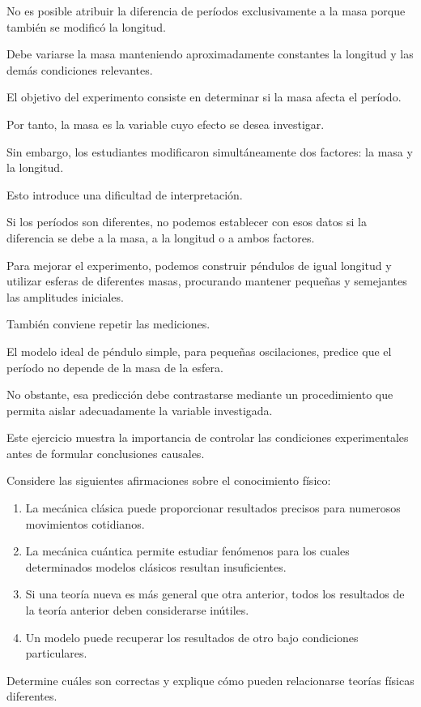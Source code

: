 \begin{respuesta}
No es posible atribuir la diferencia de períodos exclusivamente a la masa porque también se modificó la longitud.

Debe variarse la masa manteniendo aproximadamente constantes la longitud y las demás condiciones relevantes.
\end{respuesta}

\begin{explicacion}
El objetivo del experimento consiste en determinar si la masa afecta el período.

Por tanto, la masa es la variable cuyo efecto se desea investigar.

Sin embargo, los estudiantes modificaron simultáneamente dos factores: la masa y la longitud.

Esto introduce una dificultad de interpretación.

Si los períodos son diferentes, no podemos establecer con esos datos si la diferencia se debe a la masa, a la longitud o a ambos factores.

Para mejorar el experimento, podemos construir péndulos de igual longitud y utilizar esferas de diferentes masas, procurando mantener pequeñas y semejantes las amplitudes iniciales.

También conviene repetir las mediciones.

El modelo ideal de péndulo simple, para pequeñas oscilaciones, predice que el período no depende de la masa de la esfera.

No obstante, esa predicción debe contrastarse mediante un procedimiento que permita aislar adecuadamente la variable investigada.

Este ejercicio muestra la importancia de controlar las condiciones experimentales antes de formular conclusiones causales.
\end{explicacion}


\begin{ejercicio}
Considere las siguientes afirmaciones sobre el conocimiento físico:

\begin{enumerate}[label=\alph*)]
    \item La mecánica clásica puede proporcionar resultados precisos para numerosos movimientos cotidianos.
    \item La mecánica cuántica permite estudiar fenómenos para los cuales determinados modelos clásicos resultan insuficientes.
    \item Si una teoría nueva es más general que otra anterior, todos los resultados de la teoría anterior deben considerarse inútiles.
    \item Un modelo puede recuperar los resultados de otro bajo condiciones particulares.
\end{enumerate}

Determine cuáles son correctas y explique cómo pueden relacionarse teorías físicas diferentes.
\end{ejercicio}

